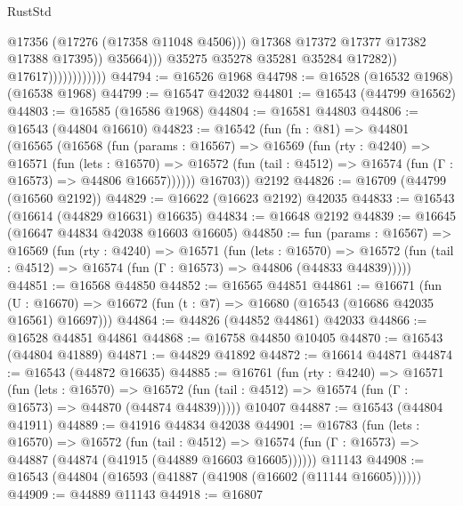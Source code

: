 \begin{lexlean}{RustStd}
\begin{coremodule}
                                            @17356
                                            (@17276 (@17358 @11048 @4506)))
                                          @17368
                                          @17372
                                          @17377
                                          @17382
                                          @17388
                                          @17395))
                                      @35664)))
                                @35275
                                @35278
                                @35281
                                @35284
                                @17282))
                            @17617))))))))))))
@44794 := @16526 @1968
@44798 := @16528 (@16532 @1968) (@16538 @1968)
@44799 := @16547 @42032
@44801 := @16543 (@44799 @16562)
@44803 := @16585 (@16586 @1968)
@44804 := @16581 @44803
@44806 := @16543 (@44804 @16610)
@44823 := @16542
    (fun (fn : @81) =>
    @44801
      (@16565
        (@16568
          (fun (params : @16567) =>
          @16569
            (fun (rty : @4240) =>
            @16571
              (fun (lets : @16570) =>
              @16572 (fun (tail : @4512) => @16574 (fun (Γ : @16573) => @44806 @16657))))))
        @16703))
    @2192
@44826 := @16709 (@44799 (@16560 @2192))
@44829 := @16622 (@16623 @2192) @42035
@44833 := @16543 (@16614 (@44829 @16631) @16635)
@44834 := @16648 @2192
@44839 := @16645 (@16647 @44834 @42038 @16603 @16605)
@44850 := fun (params : @16567) =>
  @16569
    (fun (rty : @4240) =>
    @16571
      (fun (lets : @16570) =>
      @16572 (fun (tail : @4512) => @16574 (fun (Γ : @16573) => @44806 (@44833 @44839)))))
@44851 := @16568 @44850
@44852 := @16565 @44851
@44861 := @16671
    (fun (U : @16670) => @16672 (fun (t : @7) => @16680 (@16543 (@16686 @42035 @16561) @16697)))
@44864 := @44826 (@44852 @44861) @42033
@44866 := @16528 @44851 @44861
@44868 := @16758 @44850 @10405
@44870 := @16543 (@44804 @41889)
@44871 := @44829 @41892
@44872 := @16614 @44871
@44874 := @16543 (@44872 @16635)
@44885 := @16761
    (fun (rty : @4240) =>
    @16571
      (fun (lets : @16570) =>
      @16572 (fun (tail : @4512) => @16574 (fun (Γ : @16573) => @44870 (@44874 @44839)))))
    @10407
@44887 := @16543 (@44804 @41911)
@44889 := @41916 @44834 @42038
@44901 := @16783
    (fun (lets : @16570) =>
    @16572
      (fun (tail : @4512) =>
      @16574 (fun (Γ : @16573) => @44887 (@44874 (@41915 (@44889 @16603 @16605))))))
    @11143
@44908 := @16543 (@44804 (@16593 (@41887 (@41908 (@16602 (@11144 @16605))))))
@44909 := @44889 @11143
@44918 := @16807

\end{coremodule}
\end{lexlean}
